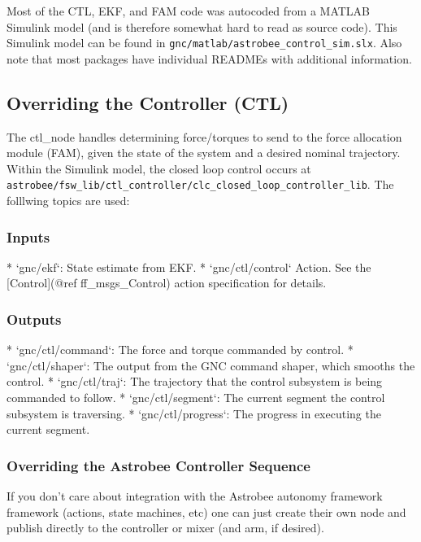 \documentclass{article}
\begin{document}
Most of the CTL, EKF, and FAM code was autocoded from a MATLAB Simulink model (and is therefore somewhat hard to read as source code). This Simulink model can be found in \texttt{gnc/matlab/astrobee\_control\_sim.slx}. Also note that most packages have individual READMEs with additional information.

\subsection{Overriding the Controller (CTL)}

The ctl\_node handles determining force/torques to send to the force allocation module (FAM), given the state of the system and a desired nominal trajectory. Within the Simulink model, the closed loop control occurs at \texttt{astrobee/fsw\_lib/ctl\_controller/clc\_closed\_loop\_controller\_lib}.
The folllwing topics are used:

\subsubsection{Inputs}
\begin{markdown}
* `gnc/ekf`: State estimate from EKF.
* `gnc/ctl/control` Action. See the  [Control](@ref ff_msgs_Control) action specification for details.
\end{markdown}

\subsubsection{Outputs}
\begin{markdown}
* `gnc/ctl/command`: The force and torque commanded by control.
* `gnc/ctl/shaper`: The output from the GNC command shaper, which smooths the control.
* `gnc/ctl/traj`: The trajectory that the control subsystem is being commanded to follow.
* `gnc/ctl/segment`: The current segment the control subsystem is traversing.
* `gnc/ctl/progress`: The progress in executing the current segment.
\end{markdown}

\subsubsection{Overriding the Astrobee Controller Sequence}

If you don't care about integration with the Astrobee autonomy framework
framework (actions, state machines, etc) one can just create their
own node and publish directly to the controller or mixer (and arm, if desired).
\\
\end{document}
